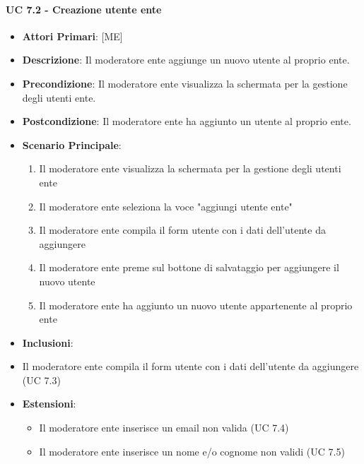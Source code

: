 			\paragraph{UC 7.2 - Creazione utente ente}
			\begin{itemize}
				\item \textbf{Attori Primari}: [ME]
				\item \textbf{Descrizione}: Il moderatore ente aggiunge un nuovo utente al proprio ente.
				\item \textbf{Precondizione}: Il moderatore ente visualizza la schermata per la gestione degli utenti ente.
				\item \textbf{Postcondizione}: Il moderatore ente ha aggiunto un utente al proprio ente.
				\item \textbf{Scenario Principale}:
				\begin{enumerate}
					\item{Il moderatore ente visualizza la schermata per la gestione degli utenti ente}
					\item{Il moderatore ente seleziona la voce "aggiungi utente ente"}
					\item{Il moderatore ente compila il form utente con i dati dell'utente da aggiungere}
					\item{Il moderatore ente preme sul bottone di salvataggio per aggiungere il nuovo utente}
					\item{Il moderatore ente ha aggiunto un nuovo utente appartenente al proprio ente}
				\end{enumerate}	
				\item \textbf{Inclusioni}:
					\item Il moderatore ente compila il form utente con i dati dell'utente da aggiungere (UC 7.3)
				\item \textbf{Estensioni}:
				\begin{itemize}
					\item Il moderatore ente inserisce un email non valida (UC 7.4)
					\item Il moderatore ente inserisce un nome e/o cognome non validi (UC 7.5)
				\end{itemize}
			\end{itemize}
			
